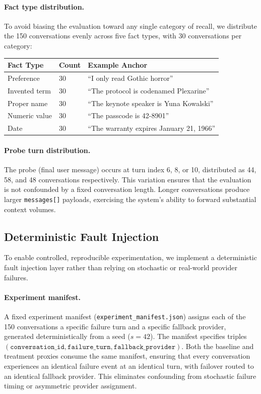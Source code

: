 \paragraph{Fact type distribution.}
To avoid biasing the evaluation toward any single category of recall, we distribute the 150 conversations evenly across five fact types, with 30 conversations per category:

\begin{center}
\small
\begin{tabular}{lll}
\toprule
\textbf{Fact Type} & \textbf{Count} & \textbf{Example Anchor} \\
\midrule
Preference & 30 & ``I only read Gothic horror'' \\
Invented term & 30 & ``The protocol is codenamed Plexarine'' \\
Proper name & 30 & ``The keynote speaker is Yuna Kowalski'' \\
Numeric value & 30 & ``The passcode is 42-8901'' \\
Date & 30 & ``The warranty expires January 21, 1966'' \\
\bottomrule
\end{tabular}
\end{center}

\paragraph{Probe turn distribution.}
The probe (final user message) occurs at turn index 6, 8, or 10, distributed as 44, 58, and 48 conversations respectively. This variation ensures that the evaluation is not confounded by a fixed conversation length. Longer conversations produce larger \texttt{messages[]} payloads, exercising the system's ability to forward substantial context volumes.

\subsection{Deterministic Fault Injection}

To enable controlled, reproducible experimentation, we implement a deterministic fault injection layer rather than relying on stochastic or real-world provider failures.

\paragraph{Experiment manifest.}
A fixed experiment manifest (\texttt{experiment\_manifest.json}) assigns each of the 150 conversations a specific failure turn and a specific fallback provider, generated deterministically from a seed ($s = 42$). The manifest specifies triples $(\texttt{conversation\_id}, \texttt{failure\_turn}, \texttt{fallback\_provider})$. Both the baseline and treatment proxies consume the same manifest, ensuring that every conversation experiences an identical failure event at an identical turn, with failover routed to an identical fallback provider. This eliminates confounding from stochastic failure timing or asymmetric provider assignment.

